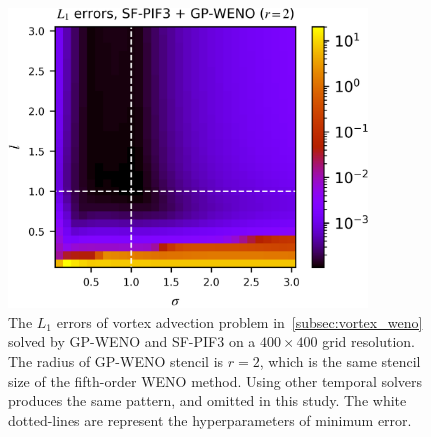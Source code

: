 \begin{figure}
    \centering
    \includegraphics[width=0.85\textwidth]{fig/hp_cmap_gp2_sf3.png}
    \caption{The \( L_{1} \) errors of vortex advection problem in~\cref{subsec:vortex_weno} solved by
        GP-WENO and SF-PIF3 on a \( 400 \times 400 \) grid resolution.
        The radius of GP-WENO stencil is \( r=2 \), which is the same
        stencil size of the fifth-order WENO method.
        Using other temporal solvers produces the same pattern,
        and omitted in this study.
        The white dotted-lines are represent the
        hyperparameters of minimum error.
    }\label{fig:gp_hp_cmap}
\end{figure}

